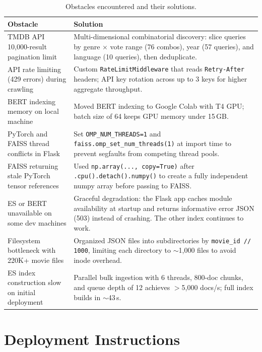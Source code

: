 \documentclass[11pt,a4paper]{article}
\begin{document}
\begin{table}[H]
\centering
\small
\begin{tabular}{@{}p{5cm}p{9cm}@{}}
\toprule
\textbf{Obstacle} & \textbf{Solution} \\
\midrule
TMDB API 10,000-result pagination limit & Multi-dimensional combinatorial discovery: slice queries by genre $\times$ vote range (76 combos), year (57 queries), and language (10 queries), then deduplicate. \\
\addlinespace
API rate limiting (429 errors) during crawling & Custom \texttt{RateLimitMiddleware} that reads \texttt{Retry-After} headers; API key rotation across up to 3 keys for higher aggregate throughput. \\
\addlinespace
BERT indexing memory on local machine & Moved BERT indexing to Google Colab with T4 GPU; batch size of 64 keeps GPU memory under 15\,GB. \\
\addlinespace
PyTorch and FAISS thread conflicts in Flask & Set \texttt{OMP\_NUM\_THREADS=1} and \texttt{faiss.omp\_set\_num\_threads(1)} at import time to prevent segfaults from competing thread pools. \\
\addlinespace
FAISS returning stale PyTorch tensor references & Used \texttt{np.array(..., copy=True)} after \texttt{.cpu().detach().numpy()} to create a fully independent numpy array before passing to FAISS. \\
\addlinespace
ES or BERT unavailable on some dev machines & Graceful degradation: the Flask app caches module availability at startup and returns informative error JSON (503) instead of crashing. The other index continues to work. \\
\addlinespace
Filesystem bottleneck with 220K+ movie files & Organized JSON files into subdirectories by \texttt{movie\_id // 1000}, limiting each directory to $\sim$1,000 files to avoid inode overhead. \\
\addlinespace
ES index construction slow on initial deployment & Parallel bulk ingestion with 6 threads, 800-doc chunks, and queue depth of 12 achieves $>$5,000 docs/s; full index builds in $\sim$43\,s. \\
\bottomrule
\end{tabular}
\caption{Obstacles encountered and their solutions.}
\end{table}

\section{Deployment Instructions}
\end{document}
